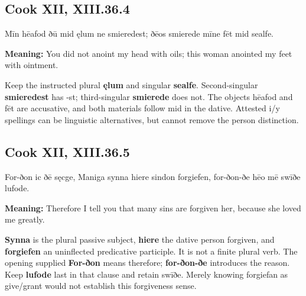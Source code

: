 \par\begin{minipage}{\linewidth}\raggedright
\subsection*{Cook XII, XIII.36.4}

Mīn hēafod ðū mid ęlum ne smieredest; ðēos smierede mīne fēt mid sealfe.

\textbf{Meaning:} You did not anoint my head with oils; this woman anointed my feet with ointment.

Keep the instructed plural \textbf{ęlum} and singular \textbf{sealfe}. Second-singular \textbf{smieredest} has -st; third-singular \textbf{smierede} does not. The objects hēafod and fēt are accusative, and both materials follow mid in the dative. Attested i/\allowbreak{}y spellings can be linguistic alternatives, but cannot remove the person distinction.

\end{minipage}\par\addvspace{4pt}

\par\begin{minipage}{\linewidth}\raggedright
\subsection*{Cook XII, XIII.36.5}

For-ðon ic ðē sęcge, Maniga synna hiere sindon forgiefen, for-ðon-ðe hēo mē swīðe lufode.

\textbf{Meaning:} Therefore I tell you that many sins are forgiven her, because she loved me greatly.

\textbf{Synna} is the plural passive subject, \textbf{hiere} the dative person forgiven, and \textbf{forgiefen} an uninflected predicative participle. It is not a finite plural verb. The opening supplied \textbf{For-ðon} means therefore; \textbf{for-ðon-ðe} introduces the reason. Keep \textbf{lufode} last in that clause and retain swīðe. Merely knowing forgiefan as give/\allowbreak{}grant would not establish this forgiveness sense.

\end{minipage}\par\addvspace{4pt}

